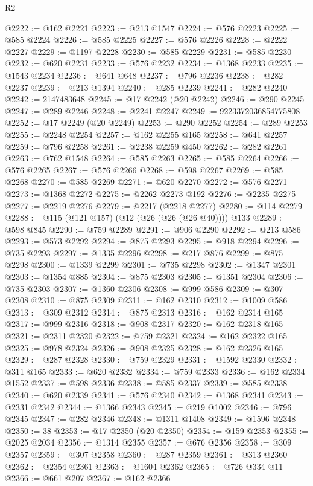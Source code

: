 \begin{lexlean}{R2}
\begin{coremodule}
@2222 := @162 @2221
@2223 := @213 @1547
@2224 := @576 @2223
@2225 := @585 @2224
@2226 := @585 @2225
@2227 := @576 @2226
@2228 := @2222 @2227
@2229 := @1197 @2228
@2230 := @585 @2229
@2231 := @585 @2230
@2232 := @620 @2231
@2233 := @576 @2232
@2234 := @1368 @2233
@2235 := @1543 @2234
@2236 := @641 @648
@2237 := @796 @2236
@2238 := @282 @2237
@2239 := @213 @1394
@2240 := @285 @2239
@2241 := @282 @2240
@2242 := 2147483648
@2245 := @17 @2242 (@20 @2242)
@2246 := @290 @2245
@2247 := @289 @2246
@2248 := @2241 @2247
@2249 := 9223372036854775808
@2252 := @17 @2249 (@20 @2249)
@2253 := @290 @2252
@2254 := @289 @2253
@2255 := @2248 @2254
@2257 := @162 @2255 @165
@2258 := @641 @2257
@2259 := @796 @2258
@2261 := @2238 @2259 @450
@2262 := @282 @2261
@2263 := @762 @1548
@2264 := @585 @2263
@2265 := @585 @2264
@2266 := @576 @2265
@2267 := @576 @2266
@2268 := @598 @2267
@2269 := @585 @2268
@2270 := @585 @2269
@2271 := @620 @2270
@2272 := @576 @2271
@2273 := @1368 @2272
@2275 := @2262 @2273 @192
@2276 := @2235 @2275
@2277 := @2219 @2276
@2279 := @2217 (@2218 @2277)
@2280 := @114 @2279
@2288 := @115 (@121 @157) (@12 (@26 (@26 (@26 @40)))) @133
@2289 := @598 @845
@2290 := @759 @2289
@2291 := @906 @2290
@2292 := @213 @586
@2293 := @573 @2292
@2294 := @875 @2293
@2295 := @918 @2294
@2296 := @735 @2293
@2297 := @1335 @2296
@2298 := @217 @876
@2299 := @875 @2298
@2300 := @1339 @2299
@2301 := @735 @2298
@2302 := @1347 @2301
@2303 := @1354 @885
@2304 := @875 @2303
@2305 := @1351 @2304
@2306 := @735 @2303
@2307 := @1360 @2306
@2308 := @999 @586
@2309 := @307 @2308
@2310 := @875 @2309
@2311 := @162 @2310
@2312 := @1009 @586
@2313 := @309 @2312
@2314 := @875 @2313
@2316 := @162 @2314 @165
@2317 := @999 @2316
@2318 := @908 @2317
@2320 := @162 @2318 @165
@2321 := @2311 @2320
@2322 := @759 @2321
@2324 := @162 @2322 @165
@2325 := @978 @2324
@2326 := @908 @2325
@2328 := @162 @2326 @165
@2329 := @287 @2328
@2330 := @759 @2329
@2331 := @1592 @2330
@2332 := @311 @165
@2333 := @620 @2332
@2334 := @759 @2333
@2336 := @162 @2334 @1552
@2337 := @598 @2336
@2338 := @585 @2337
@2339 := @585 @2338
@2340 := @620 @2339
@2341 := @576 @2340
@2342 := @1368 @2341
@2343 := @2331 @2342
@2344 := @1366 @2343
@2345 := @219 @1002
@2346 := @796 @2345
@2347 := @282 @2346
@2348 := @1311 @1408
@2349 := @1596 @2348
@2350 := 38
@2353 := @17 @2350 (@20 @2350)
@2354 := @159 @2353
@2355 := @2025 @2034
@2356 := @1314 @2355
@2357 := @676 @2356
@2358 := @309 @2357
@2359 := @307 @2358
@2360 := @287 @2359
@2361 := @313 @2360
@2362 := @2354 @2361
@2363 := @1604 @2362
@2365 := @726 @334 @11
@2366 := @661 @207
@2367 := @162 @2366

\end{coremodule}
\end{lexlean}
